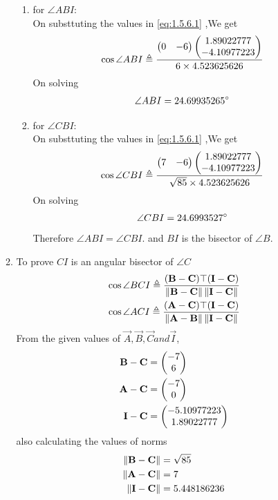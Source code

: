 \documentclass[11pt]{book}
\begin{document}
\begin{enumerate}[label=\thesection.\arabic*.,ref=\thesection.\theenumi]
\begin{enumerate}
\begin{enumerate}
    \item for $\angle ABI$: \\
    On substtuting the values in  \eqref{eq:1.5.6.1} ,We get 
    \begin{align}
        \cos{\angle ABI} \triangleq \frac{\begin{pmatrix} 0 & -6\end{pmatrix}\begin{pmatrix}1.89022777 \\ -4.10977223\end{pmatrix}}{ 6\times 4.523625626} \\
    \end{align}
    On solving 
    \begin{align}
        \angle ABI = 24.69935265\degree
    \end{align}
    
       \item for $\angle CBI$: \\
    On substtuting the values in  \eqref{eq:1.5.6.1} ,We get 
    \begin{align}
        \cos{\angle CBI} \triangleq \frac{\begin{pmatrix} 7 & -6\end{pmatrix}\begin{pmatrix}1.89022777 \\ -4.10977223\end{pmatrix}}{ \sqrt{85} \times 4.523625626} \\
    \end{align}
    On solving 
    \begin{align}
        \angle CBI = 24.6993527\degree
    \end{align}
    Therefore $\angle ABI = \angle CBI.$ and $BI$ is the bisector of $\angle B$. 
\end{enumerate}

    \item To prove $CI$ is an angular bisector of $ \angle C$
\begin{align}
\label{eq:1.5.6.18}
\cos{\angle BCI} \triangleq \frac{(\vec{B}-\vec{C})\top(\vec{I}-\vec{C})}{\norm{\vec{B}-\vec{C}}\norm{\vec{I}-\vec{C}}} \\
\cos{\angle ACI} \triangleq \frac{(\vec{A}-\vec{C})\top(\vec{I}-\vec{C})}{\norm{\vec{A}-\vec{B}}\norm{\vec{I}-\vec{C}}} 
\end{align}
From the given values of $\vec{A},\vec{B},\vec{C} and \vec{I}$,\\
\begin{align}
	\mathbf{B}-\mathbf{C} &=\begin{pmatrix}-7\\6\end{pmatrix} \\
	\mathbf{A}-\mathbf{C}&= \begin{pmatrix}-7\\0\end{pmatrix} \\
 \mathbf{I}-\mathbf{C}  &=\begin{pmatrix}-5.10977223 \\ 1.89022777\end{pmatrix}
\end{align}
also calculating the values of norms
\begin{align}
	\left\lVert\mathbf{B}-\mathbf{C}\right\rVert &=\sqrt{85} \\
	\left\lVert\mathbf{A}-\mathbf{C}\right\rVert &= 7 \\
 	\left\lVert\mathbf{I}-\mathbf{C}\right\rVert &= 5.448186236 \\
\end{align}


\end{enumerate}
\end{enumerate}
\end{document}
